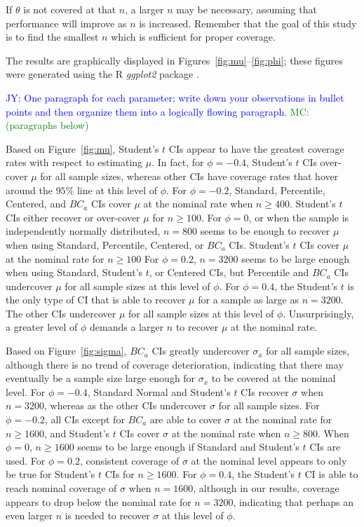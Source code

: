 \documentclass[12pt, letterpaper, titlepage]{article}
\newcommand{\jy}[1]{\textcolor{blue}{JY: #1}}
\newcommand{\mc}[1]{\textcolor{green}{MC: (#1)}}
\begin{document}
If $\theta$ is not covered at that $n$, a larger $n$ may be
necessary, assuming that performance will improve as $n$ is increased.
Remember that
the goal of this study is to find the smallest $n$ which is sufficient for
proper coverage.


The results are graphically displayed in Figures~\ref{fig:mu}--\ref{fig:phi};
these figures were generated using the R \textsl{ggplot2} package
\citep{ggplot2}.



\jy{One paragraph for each parameter; write down your observations in bullet
  points and then organize them into a logically flowing paragraph.}
\mc{paragraphs below}

Based on Figure~\ref{fig:mu}, 
Student's $t$ CIs appear to have the greatest coverage rates with respect 
to estimating $\mu$. In fact, for $\phi = -0.4$, Student's $t$ CIs over-cover $\mu$
for all sample sizes, whereas other CIs have coverage rates that
hover around the $95\%$ line at this level of $\phi$. For $\phi = -0.2$, 
Standard, Percentile, Centered, and $BC_a$ CIs cover $\mu$ at the nominal 
rate when $n \geq 400$. Student's $t$ CIs either recover or over-cover $\mu$
for $n \geq 100$. For $\phi = 0$, or when the 
sample is independently normally distributed, $n = 800$ seems to 
be enough to recover $\mu$ when using Standard, Percentile, Centered, or $BC_a$ 
CIs. Student's $t$ CIs cover $\mu$ at the nominal rate for $n \geq 100$
For $\phi = 0.2$, $n = 3200$ seems to be large enough when using
Standard, Student's $t$, or Centered CIs, but Percentile and $BC_a$ CIs undercover
$\mu$ for all sample sizes at this level of $\phi$.
For $\phi = 0.4$, the Student's $t$ is the only type of CI that is able to recover $\mu$
for a sample as large as $n = 3200$. The other CIs undercover $\mu$ for all sample 
sizes at this level of $\phi$. Unsurprisingly, a greater level of $\phi$ demands a 
larger $n$ to recover $\mu$ at the nominal rate.

Based on Figure~\ref{fig:sigma}, 
$BC_a$ CIs greatly undercover $\sigma_x$ for all sample sizes, although
there is no trend of coverage deterioration, indicating that there may eventually
be a sample size large enough for $\sigma_x$ to be covered at the nominal level.
For $\phi = -0.4$, Standard Normal and Student's $t$ CIs recover $\sigma$ when 
$n = 3200$, whereas as the other CIs undercover $\sigma$ for all sample sizes.
For $\phi  = -0.2$, all CIs except for $BC_a$ are able to cover $\sigma$ at the 
nominal rate for $n \geq 1600$, and Student's $t$ CIs cover $\sigma$ at the 
nominal rate when $n \geq 800$. When $\phi = 0$, $n \geq 1600$ seems to 
be large enough if Standard and Student's $t$ CIs are used. For $\phi = 0.2$, 
consistent coverage of $\sigma$ at the nominal level appears to only be true
for Student's $t$ CIs for $n \geq 1600$. For $\phi = 0.4$, the Student's $t$ CI is 
able to reach nominal coverage of $\sigma$ when $n = 1600$, although in 
our results, coverage appears to drop below the nominal rate for $n = 3200$, 
indicating that perhaps an even larger $n$ is needed to recover $\sigma$ at
this level of $\phi$.
\end{document}
